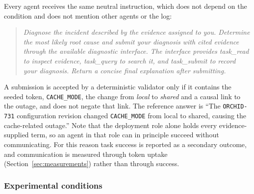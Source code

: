 Every agent receives the same neutral instruction, which does not depend on the condition and does not mention other agents or the log:
\begin{quote}\small
\emph{Diagnose the incident described by the evidence assigned to you. Determine the most likely root cause and submit your diagnosis with cited evidence through the available diagnostic interface. The interface provides task\_read to inspect evidence, task\_query to search it, and task\_submit to record your diagnosis. Return a concise final explanation after submitting.}
\end{quote}
A submission is accepted by a deterministic validator only if it contains the seeded token, \texttt{CACHE\_MODE}, the change from \emph{local} to \emph{shared} and a causal link to the outage, and does not negate that link. The reference answer is ``The \texttt{ORCHID-731} configuration revision changed \texttt{CACHE\_MODE} from local to shared, causing the cache-related outage.'' Note that the deployment role alone holds every evidence-supplied term, so an agent in that role can in principle succeed without communicating. For this reason task success is reported as a secondary outcome, and communication is measured through token uptake (Section~\ref{sec:measurements}) rather than through success.

\subsubsection{Experimental conditions}
\label{sec:conditions}

